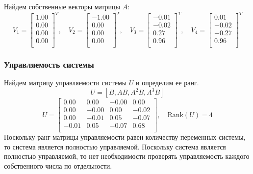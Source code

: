 Найдем собственные векторы матрицы $A$:
\begin{equation}
    V_1 = \begin{bmatrix}
    1.00  \\ 0.00  \\ 0.00 \\ 0.00 \\
    \end{bmatrix}^T,\quad
    V_2 = \begin{bmatrix}
    -1.00 \\ 0.00 \\ 0.00 \\ 0.00 \\
    \end{bmatrix}^T,\quad
    V_3 = \begin{bmatrix}
    -0.01 \\ -0.02 \\ 0.27 \\ 0.96 \\
    \end{bmatrix}^T,\quad
    V_4 = \begin{bmatrix}
    0.01  \\ -0.02  \\ -0.27 \\ 0.96 \\
    \end{bmatrix}^T
\end{equation}

\subsubsection{Управляемость системы}
Найдем матрицу управляемости системы $U$ и определим ее ранг. 
\begin{equation}
    U = [B, AB, A^2B, A^3B]
\end{equation}
\begin{equation}
    U = \begin{bmatrix}
    0.00  & 0.00  & -0.00  & 0.00 \\ 
    0.00  & -0.00  & 0.00  & -0.02 \\ 
    0.00  & -0.01  & 0.05  & -0.07 \\ 
    -0.01  & 0.05  & -0.07  & 0.68 \\ 
    \end{bmatrix}, \quad \text{Rank}(U) = 4
    \label{eq:controlability_matrix}
\end{equation}
Поскольку ранг матрицы управляемости равен количеству переменных системы, то система является полностью управляемой. 
Поскольку система является полностью управляемой, то нет необходимости проверять управляемость каждого собственного 
числа по отдельности. 

